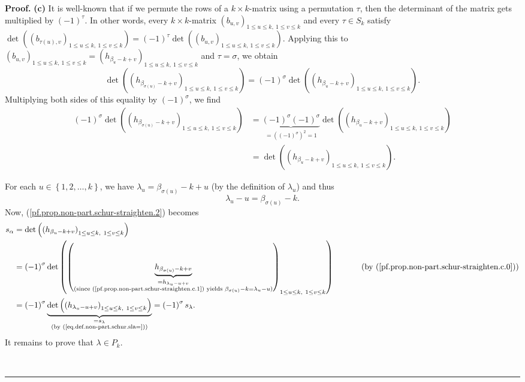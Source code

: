 \documentclass[numbers=enddot,12pt,final,onecolumn,notitlepage]{scrartcl}%
\theoremstyle{definition}
\newenvironment{proof}[1][Proof]{\noindent\textbf{#1.} }{\ \rule{0.5em}{0.5em}}
\begin{document}
\begin{proof}
\textbf{(c)} It is well-known that if we permute the rows of a $k\times
k$-matrix using a permutation $\tau$, then the determinant of the matrix gets
multiplied by $\left(  -1\right)  ^{\tau}$. In other words, every $k\times
k$-matrix $\left(  b_{u,v}\right)  _{1\leq u\leq k,\ 1\leq v\leq k}$ and every
$\tau\in S_{k}$ satisfy $\det\left(  \left(  b_{\tau\left(  u\right)
,v}\right)  _{1\leq u\leq k,\ 1\leq v\leq k}\right)  =\left(  -1\right)
^{\tau}\det\left(  \left(  b_{u,v}\right)  _{1\leq u\leq k,\ 1\leq v\leq
k}\right)  $. Applying this to $\left(  b_{u,v}\right)  _{1\leq u\leq
k,\ 1\leq v\leq k}=\left(  h_{\beta_{u}-k+v}\right)  _{1\leq u\leq k,\ 1\leq
v\leq k}$ and $\tau=\sigma$, we obtain%
\[
\det\left(  \left(  h_{\beta_{\sigma\left(  u\right)  }-k+v}\right)  _{1\leq
u\leq k,\ 1\leq v\leq k}\right)  =\left(  -1\right)  ^{\sigma}\det\left(
\left(  h_{\beta_{u}-k+v}\right)  _{1\leq u\leq k,\ 1\leq v\leq k}\right)  .
\]
Multiplying both sides of this equality by $\left(  -1\right)  ^{\sigma}$, we
find%
\begin{align}
\left(  -1\right)  ^{\sigma}\det\left(  \left(  h_{\beta_{\sigma\left(
u\right)  }-k+v}\right)  _{1\leq u\leq k,\ 1\leq v\leq k}\right)   &
=\underbrace{\left(  -1\right)  ^{\sigma}\left(  -1\right)  ^{\sigma}%
}_{=\left(  \left(  -1\right)  ^{\sigma}\right)  ^{2}=1}\det\left(  \left(
h_{\beta_{u}-k+v}\right)  _{1\leq u\leq k,\ 1\leq v\leq k}\right) \nonumber\\
&  =\det\left(  \left(  h_{\beta_{u}-k+v}\right)  _{1\leq u\leq k,\ 1\leq
v\leq k}\right)  . \label{pf.prop.non-part.schur-straighten.c.0}%
\end{align}


For each $u\in\left\{  1,2,\ldots,k\right\}  $, we have $\lambda_{u}%
=\beta_{\sigma\left(  u\right)  }-k+u$ (by the definition of $\lambda_{u}$)
and thus
\begin{equation}
\lambda_{u}-u=\beta_{\sigma\left(  u\right)  }-k.
\label{pf.prop.non-part.schur-straighten.c.1}%
\end{equation}
Now, (\ref{pf.prop.non-part.schur-straighten.2}) becomes%
\begin{align*}
s_{\alpha}  &  =\det\left(  \left(  h_{\beta_{u}-k+v}\right)  _{1\leq u\leq
k,\ 1\leq v\leq k}\right) \\
&  =\left(  -1\right)  ^{\sigma}\det\left(  \left(  \underbrace{h_{\beta
_{\sigma\left(  u\right)  }-k+v}}_{\substack{=h_{\lambda_{u}-u+v}%
\\\text{(since (\ref{pf.prop.non-part.schur-straighten.c.1}) yields }%
\beta_{\sigma\left(  u\right)  }-k=\lambda_{u}-u\text{)}}}\right)  _{1\leq
u\leq k,\ 1\leq v\leq k}\right)  \ \ \ \ \ \ \ \ \ \ \left(  \text{by
(\ref{pf.prop.non-part.schur-straighten.c.0})}\right) \\
&  =\left(  -1\right)  ^{\sigma}\underbrace{\det\left(  \left(  h_{\lambda
_{u}-u+v}\right)  _{1\leq u\leq k,\ 1\leq v\leq k}\right)  }%
_{\substack{=s_{\lambda}\\\text{(by (\ref{eq.def.non-part.schur.sla=}))}%
}}=\left(  -1\right)  ^{\sigma}s_{\lambda}.
\end{align*}
It remains to prove that $\lambda\in P_{k}$.


\end{proof}
\end{document}
